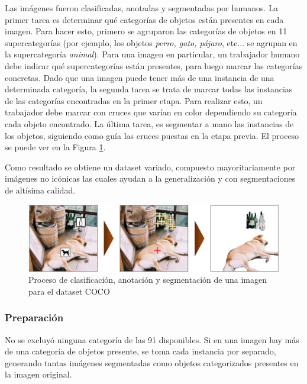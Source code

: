 \documentclass[spanish]{report}
\begin{document}
Las imágenes fueron clasificadas, anotadas y segmentadas por humanos. La primer tarea es determinar qué categorías de objetos están presentes en cada imagen. Para hacer esto, primero se agruparon las categorías de objetos en 11 supercategorías (por ejemplo, los objetos \textit{perro, gato, pájaro}, etc... se agrupan en la supercategoría \textit{animal}). Para una imagen en particular, un trabajador humano debe indicar qué supercategorías están presentes, para luego marcar las categorías concretas. Dado que una imagen puede tener más de una instancia de una determinada categoría, la segunda tarea se trata de marcar todas las instancias de las categorías encontradas en la primer etapa. Para realizar esto, un trabajador debe marcar con cruces que varían en color dependiendo su categoría cada objeto encontrado. La última tarea, es segmentar a mano las instancias de los objetos, siguiendo como guía las cruces puestas en la etapa previa. El proceso se puede ver en la Figura \ref{fig:proceso_segmentacion}.

Como resultado se obtiene un dataset variado, compuesto mayoritariamente por imágenes no icónicas las cuales ayudan a la generalización y con segmentaciones de altísima calidad.

\begin{figure}[H]
\centering
 \includegraphics[width=\linewidth]{proceso_segmentacion.png}
   \caption[Proceso de clasificación, anotación y segmentación de una imagen para el dataset COCO.]{Proceso de clasificación, anotación y segmentación de una imagen para el dataset COCO \protect\footnotemark}
  \label{fig:proceso_segmentacion}
\end{figure}


\subsubsection{Preparación}

No se excluyó ninguna categoría de las 91 disponibles. Si en una imagen hay más de una categoría de objetos presente, se toma cada instancia por separado, generando tantas imágenes segmentadas como objetos categorizados presentes en la imagen original. 
\end{document}
